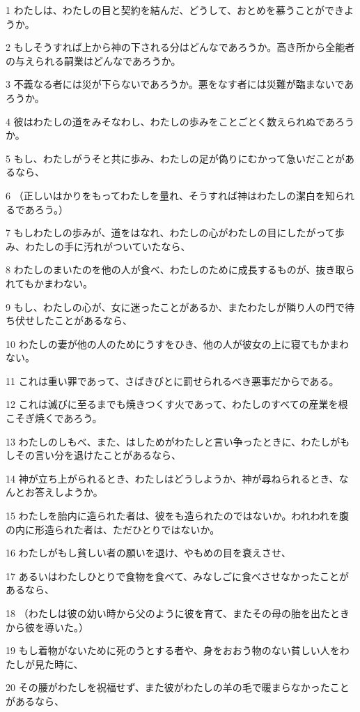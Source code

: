 \par 1 わたしは、わたしの目と契約を結んだ、どうして、おとめを慕うことができようか。
\par 2 もしそうすれば上から神の下される分はどんなであろうか。高き所から全能者の与えられる嗣業はどんなであろうか。
\par 3 不義なる者には災が下らないであろうか。悪をなす者には災難が臨まないであろうか。
\par 4 彼はわたしの道をみそなわし、わたしの歩みをことごとく数えられぬであろうか。
\par 5 もし、わたしがうそと共に歩み、わたしの足が偽りにむかって急いだことがあるなら、
\par 6 （正しいはかりをもってわたしを量れ、そうすれば神はわたしの潔白を知られるであろう。）
\par 7 もしわたしの歩みが、道をはなれ、わたしの心がわたしの目にしたがって歩み、わたしの手に汚れがついていたなら、
\par 8 わたしのまいたのを他の人が食べ、わたしのために成長するものが、抜き取られてもかまわない。
\par 9 もし、わたしの心が、女に迷ったことがあるか、またわたしが隣り人の門で待ち伏せしたことがあるなら、
\par 10 わたしの妻が他の人のためにうすをひき、他の人が彼女の上に寝てもかまわない。
\par 11 これは重い罪であって、さばきびとに罰せられるべき悪事だからである。
\par 12 これは滅びに至るまでも焼きつくす火であって、わたしのすべての産業を根こそぎ焼くであろう。
\par 13 わたしのしもべ、また、はしためがわたしと言い争ったときに、わたしがもしその言い分を退けたことがあるなら、
\par 14 神が立ち上がられるとき、わたしはどうしようか、神が尋ねられるとき、なんとお答えしようか。
\par 15 わたしを胎内に造られた者は、彼をも造られたのではないか。われわれを腹の内に形造られた者は、ただひとりではないか。
\par 16 わたしがもし貧しい者の願いを退け、やもめの目を衰えさせ、
\par 17 あるいはわたしひとりで食物を食べて、みなしごに食べさせなかったことがあるなら、
\par 18 （わたしは彼の幼い時から父のように彼を育て、またその母の胎を出たときから彼を導いた。）
\par 19 もし着物がないために死のうとする者や、身をおおう物のない貧しい人をわたしが見た時に、
\par 20 その腰がわたしを祝福せず、また彼がわたしの羊の毛で暖まらなかったことがあるなら、
